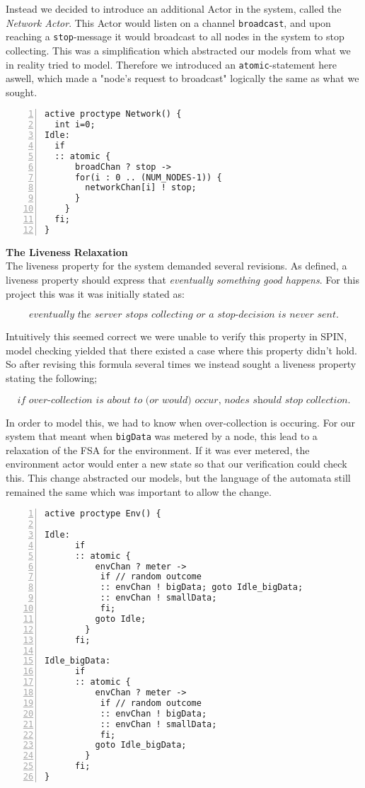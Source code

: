 Instead we decided to introduce an additional Actor in the system, called the \textit{Network Actor}. This Actor would listen on a channel \texttt{broadcast}, and upon reaching a \texttt{stop}-message it would broadcast to all nodes in the system to stop collecting. This was a simplification which abstracted our models from what we in reality tried to model. Therefore we introduced an \texttt{atomic}-statement here aswell, which made a "node's request to broadcast" logically the same as what we sought. 

\begin{lstlisting}[caption={Network Actor},language=Promela, numbers=left, basicstyle=\footnotesize, tabsize=2]
active proctype Network() {
  int i=0;
Idle: 
  if 
  :: atomic {
      broadChan ? stop ->
      for(i : 0 .. (NUM_NODES-1)) {
        networkChan[i] ! stop;
      }
    }
  fi;
}
\end{lstlisting}

\textbf{The Liveness Relaxation} \\


The liveness property for the system demanded several revisions. As defined, a liveness property should express that \textit{eventually something good happens}. For this project this was it was initially stated as: 

\[ \textit{eventually the server stops collecting or a stop-decision is never sent.} \]

Intuitively this seemed correct we were unable to verify this property in SPIN, model checking yielded that there existed a case where this property didn't hold. So after revising this formula several times we instead sought a liveness property stating the following;

\[ \textit{if over-collection is about to (or would) occur, nodes should stop collection.} \]

In order to model this, we had to know when over-collection is occuring. For our system that meant when \texttt{bigData} was metered by a node, this lead to a relaxation of the FSA for the environment. If it was ever metered, the environment actor would enter a new state so that our verification could check this. This change abstracted our models, but the language of the automata still remained the same which was important to allow the change. 

\begin{lstlisting}[caption=Environment code,language=Promela, numbers=left, basicstyle=\footnotesize, tabsize=2]
active proctype Env() {

Idle:  
      if
      :: atomic { 
          envChan ? meter ->  
           if // random outcome 
           :: envChan ! bigData; goto Idle_bigData;
           :: envChan ! smallData;
           fi; 
          goto Idle;
        }
      fi;

Idle_bigData:
      if
      :: atomic { 
          envChan ? meter ->  
           if // random outcome 
           :: envChan ! bigData;
           :: envChan ! smallData;
           fi; 
          goto Idle_bigData;
        }
      fi;       
}
\end{lstlisting}

